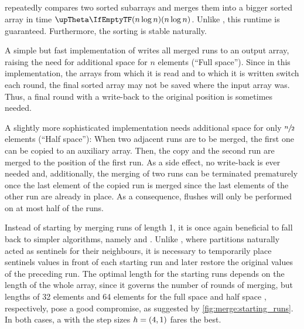 \subsection{\texorpdfstring{\MS{}}{MergeSort}}


\MS{} repeatedly compares two sorted subarrays and merges them into a bigger sorted array in time \(\bigtheta{n \log n}\).
Unlike \QS{}, this runtime is guaranteed.
Furthermore, the sorting is stable naturally.

A simple but fast implementation of \MS{} writes all merged runs to an output array, raising the need for additional space for \(n\) elements (\enquote{Full space}).
Since in this implementation, the arrays from which it is read and to which it is written switch each round, the final sorted array may not be saved where the input array was.
Thus, a final round with a write-back to the original position is sometimes needed.

A slightly more sophisticated implementation needs additional space for only \(\sfrac{n}{2}\) elements (\enquote{Half space}):
When two adjacent runs are to be merged, the first one can be copied to an auxiliary array.
Then, the copy and the second run are merged to the position of the first run.
As a side effect, no write-back is ever needed and, additionally, the merging of two runs can be terminated prematurely once the last element of the copied run is merged since the last elements of the other run are already in place.
As a consequence, flushes will only be performed on at most half of the runs.

Instead of starting by merging runs of length 1, it is once again beneficial to fall back to simpler algorithms, namely \IS{} and \ShS{}.
Unlike \QS{}, where partitions naturally acted as sentinels for their neighbours, it is necessary to temporarily place sentinels values in front of each starting run and later restore the original values of the preceding run.
The optimal length for the starting runs depends on the length of the whole array, since it governs the number of rounds of merging, but lengths of 32 elements and 64 elements for the full space and half space \MS*{}, respectively, pose a good compromise, as suggested by \cref{fig:merge:starting_runs}.
In both cases, a \ShS{} with the step sizes \(h = (4, 1)\) fares the best.

